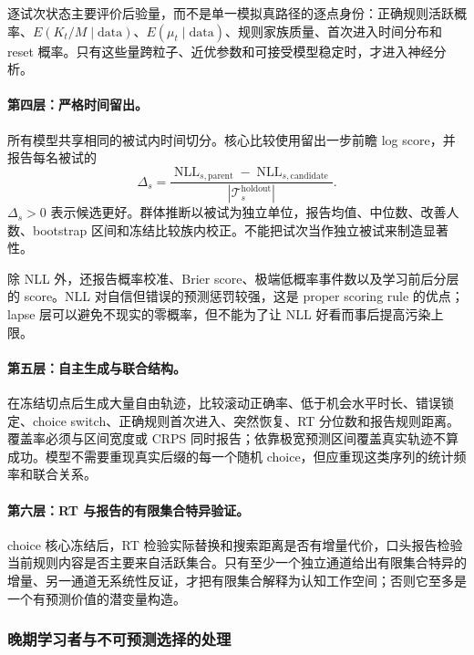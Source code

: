 逐试次状态主要评价后验量，而不是单一模拟真路径的逐点身份：正确规则活跃概率、$E(K_t/M\mid\mathrm{data})$、$E(\mu_t\mid\mathrm{data})$、规则家族质量、首次进入时间分布和 reset 概率。只有这些量跨粒子、近优参数和可接受模型稳定时，才进入神经分析。

\paragraph{第四层：严格时间留出。}
所有模型共享相同的被试内时间切分。核心比较使用留出一步前瞻 log score，并报告每名被试的
\begin{equation}
    \Delta_s
    =\frac{\operatorname{NLL}_{s,\mathrm{parent}}
      -\operatorname{NLL}_{s,\mathrm{candidate}}}
      {|\mathcal T^{\mathrm{holdout}}_s|}.
    \label{eq:model0805-subject-delta}
\end{equation}
$\Delta_s>0$ 表示候选更好。群体推断以被试为独立单位，报告均值、中位数、改善人数、bootstrap 区间和冻结比较族内校正。不能把试次当作独立被试来制造显著性。

除 NLL 外，还报告概率校准、Brier score、极端低概率事件数以及学习前后分层的 score。NLL 对自信但错误的预测惩罚较强，这是 proper scoring rule 的优点；lapse 层可以避免不现实的零概率，但不能为了让 NLL 好看而事后提高污染上限。

\paragraph{第五层：自主生成与联合结构。}
在冻结切点后生成大量自由轨迹，比较滚动正确率、低于机会水平时长、错误锁定、choice switch、正确规则首次进入、突然恢复、RT 分位数和报告规则距离。覆盖率必须与区间宽度或 CRPS 同时报告；依靠极宽预测区间覆盖真实轨迹不算成功。模型不需要重现真实后缀的每一个随机 choice，但应重现这类序列的统计频率和联合关系。

\paragraph{第六层：RT 与报告的有限集合特异验证。}
choice 核心冻结后，RT 检验实际替换和搜索距离是否有增量代价，口头报告检验当前规则内容是否主要来自活跃集合。只有至少一个独立通道给出有限集合特异的增量、另一通道无系统性反证，才把有限集合解释为认知工作空间；否则它至多是一个有预测价值的潜变量构造。


\subsubsection{晚期学习者与不可预测选择的处理}

